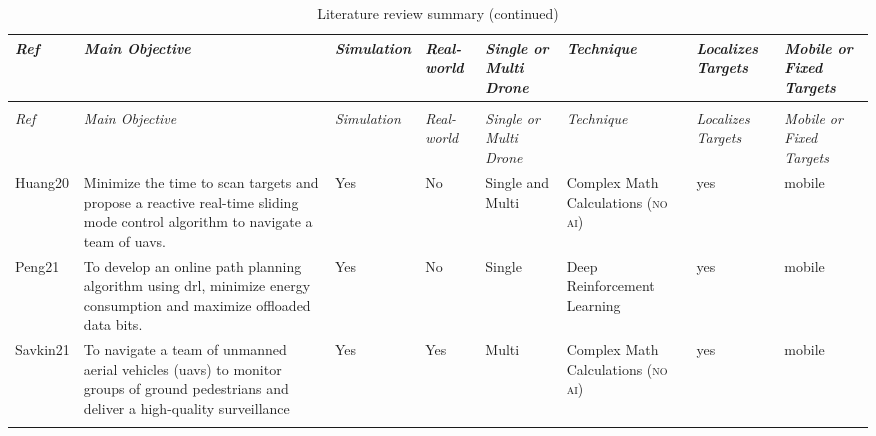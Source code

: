 \begin{center}
    \begin{small}
        \begin{longtable}{ p{0.6cm} p{4cm} p{1.6cm} p{1.3cm} p{1.4cm} p{1.4cm} p{1.4cm} p{1.4cm} }
            \caption{Literature review summary
            \label{tab:lit-summary}} \\

            \toprule
            \textit{Ref} 
                & \textit{Main Objective} 
                    & \textit{Simulation} 
                        & \textit{Real-world} 
            & \textit{Single or Multi Drone} 
                & \textit{Technique} 
                    & \textit{Localizes Targets}  
                        & \textit{Mobile or Fixed Targets} \\
            \midrule
            \endfirsthead
            \caption[]{Literature review summary (continued)}\\
            \toprule
            \textit{Ref} 
                & \textit{Main Objective} 
                    & \textit{Simulation} 
                        & \textit{Real-world} 
            & \textit{Single or Multi Drone} 
                & \textit{Technique} 
                    & \textit{Localizes Targets}  
                        & \textit{Mobile or Fixed Targets} \\
            \midrule
            \endhead

            Huang20  
                & Minimize the time to scan targets and 
                propose a reactive real-time sliding 
                mode control algorithm to navigate a team 
                of \glspl{uav}. 
                    & Yes
                        & No 
            & Single and Multi 
                & Complex Math Calculations (\textsc{no ai}) 
                    & yes 
                        & mobile \\ \addlinespace

            Peng21  
                & To develop an online path planning 
                algorithm using \gls{drl}, minimize 
                energy consumption and maximize 
                offloaded data bits. 
                    & Yes 
                        & No 
            & Single 
                & Deep Reinforcement Learning 
                    & yes 
                        & mobile \\ \addlinespace

            Savkin21
                & To navigate a team of unmanned 
                aerial vehicles (\glspl{uav}) to 
                monitor groups of ground pedestrians 
                and deliver a high-quality surveillance 
                    & Yes 
                        & Yes 
            & Multi 
                & Complex Math Calculations (\textsc{no ai}) 
                    &yes 
                        & mobile \\ \addlinespace


\end{longtable}
\end{small}
\end{center}
